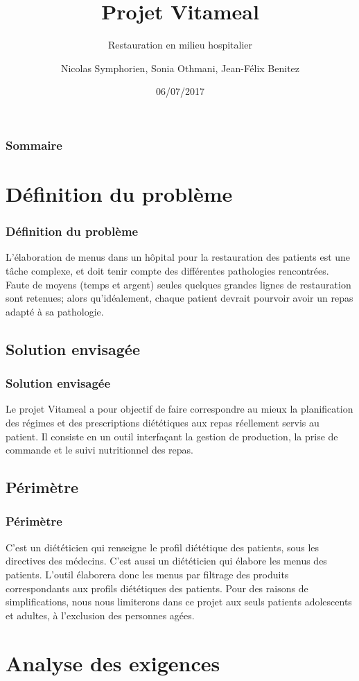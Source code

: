 \documentclass{beamer}
\title{Projet Vitameal}
\subtitle{Restauration en milieu hospitalier}
\author{Nicolas Symphorien, Sonia Othmani, Jean-Félix Benitez}
\institute{CNAM}
\date{06/07/2017}
\begin{document}
\begin{frame}[plain]
  \titlepage
\end{frame}

\begin{frame}
  \frametitle{Sommaire}
  \tableofcontents
\end{frame}

\section{Définition du problème}
\begin{frame}[label=definitionDuProbleme]
\frametitle{Définition du problème}
L'élaboration de menus dans un hôpital pour la restauration des patients
est une tâche complexe, et doit tenir compte des différentes pathologies
rencontrées. Faute de moyens (temps et argent) seules quelques grandes
lignes de restauration sont retenues; alors qu'idéalement, chaque
patient devrait pourvoir avoir un repas adapté à sa pathologie.
\end{frame}

\subsection{Solution envisagée}
\begin{frame}[label=solutionEnvisagée]
\frametitle{Solution envisagée}
Le projet Vitameal a pour objectif de faire correspondre au mieux la planification des régimes et des
prescriptions diététiques aux repas réellement servis au patient. Il consiste en un outil interfaçant la
gestion de production, la prise de commande et le suivi nutritionnel des repas.
\end{frame}

\subsection{Périmètre}
\begin{frame}[label=perimetre]
\frametitle{Périmètre}
C'est un diététicien qui renseigne le profil diététique des patients,
sous les directives des médecins. C'est aussi un diététicien qui élabore
les menus des patients. L'outil élaborera donc
les menus par filtrage des produits correspondants aux profils
diététiques des patients. Pour des raisons de simplifications, nous nous limiterons dans ce projet aux seuls patients adolescents et adultes, à l'exclusion des personnes agées.
\end{frame}

\section{Analyse des exigences}
\end{document}
